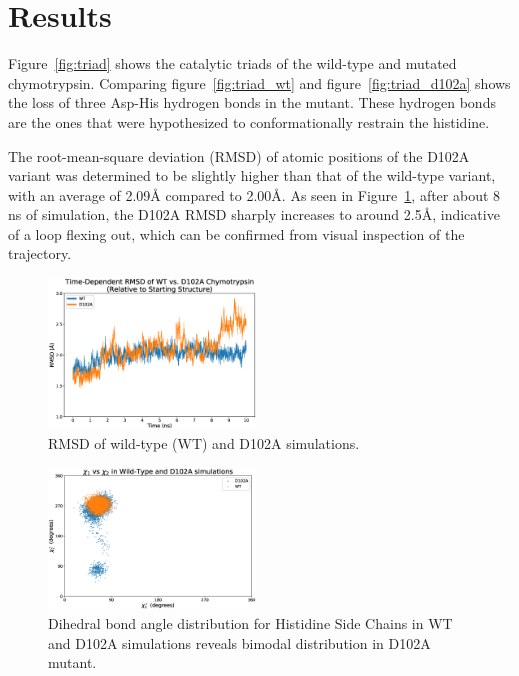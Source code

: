 \documentclass[11pt, twocolumn]{article}
\begin{document}
\section{Results}

Figure~\ref{fig:triad} shows the catalytic triads of the wild-type and mutated
chymotrypsin. Comparing figure~\ref{fig:triad_wt} and
figure~\ref{fig:triad_d102a} shows the loss of three Asp-His hydrogen bonds
in the mutant. These hydrogen bonds are the ones that were hypothesized to
conformationally restrain the histidine.

The root-mean-square deviation (RMSD) of atomic positions of the D102A variant
was determined to be slightly higher than
that of the wild-type variant, with an average of 2.09\AA{} compared to
2.00\AA{}. As seen in Figure~\ref{fig:rmsd}, after about 8 ns of simulation,
the D102A RMSD sharply increases to around 2.5\AA{}, indicative of a loop
flexing out, which can be confirmed from visual inspection of the trajectory.
\begin{figure}[H]
    \centering
        \includegraphics[width=0.49\textwidth]{rmsds.eps}
    \caption{RMSD of wild-type (WT) and D102A simulations.}\label{fig:rmsd}
\end{figure}

\vspace{-20pt}

\begin{figure}[H]
    \centering
        \includegraphics[width=0.49\textwidth]{chi_plot_wt_d102a.eps}
    \caption{Dihedral bond angle distribution for Histidine Side Chains
        in WT and D102A simulations reveals bimodal distribution
        in D102A mutant.}\label{fig:chiplot}
\end{figure}
\end{document}
